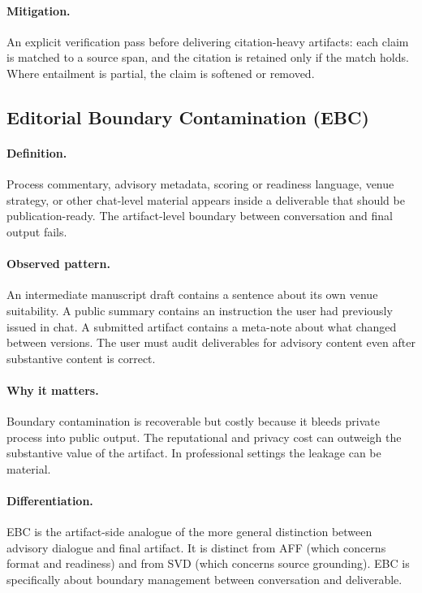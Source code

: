 \documentclass[11pt]{article}
\begin{document}
\paragraph{Mitigation.} An explicit verification pass before delivering citation-heavy artifacts: each claim is matched to a source span, and the citation is retained only if the match holds. Where entailment is partial, the claim is softened or removed.

\subsection{Editorial Boundary Contamination (EBC)}
\paragraph{Definition.} Process commentary, advisory metadata, scoring or readiness language, venue strategy, or other chat-level material appears inside a deliverable that should be publication-ready. The artifact-level boundary between conversation and final output fails.

\paragraph{Observed pattern.} An intermediate manuscript draft contains a sentence about its own venue suitability. A public summary contains an instruction the user had previously issued in chat. A submitted artifact contains a meta-note about what changed between versions. The user must audit deliverables for advisory content even after substantive content is correct.

\paragraph{Why it matters.} Boundary contamination is recoverable but costly because it bleeds private process into public output. The reputational and privacy cost can outweigh the substantive value of the artifact. In professional settings the leakage can be material.

\paragraph{Differentiation.} EBC is the artifact-side analogue of the more general distinction between advisory dialogue and final artifact. It is distinct from AFF (which concerns format and readiness) and from SVD (which concerns source grounding). EBC is specifically about boundary management between conversation and deliverable.
\end{document}
